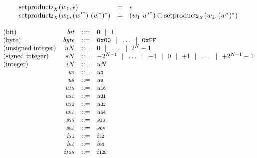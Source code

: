 $$
\begin{array}[t]{@{}lcl@{}l@{}}
{{\mathrm{setproduct{\kern-0.1em\scriptstyle 2}}}}_{X}(w_1, \epsilon) & = & \epsilon \\
{{\mathrm{setproduct{\kern-0.1em\scriptstyle 2}}}}_{X}(w_1, ({{w'}^\ast})~{({w^\ast})^\ast}) & = & (w_1~{{w'}^\ast}) \oplus {{\mathrm{setproduct{\kern-0.1em\scriptstyle 2}}}}_{X}(w_1, {({w^\ast})^\ast}) \\
\end{array}
$$

\vspace{1ex}

$$
\begin{array}[t]{@{}lrrl@{}l@{}}
\mbox{(bit)} & {\mathit{bit}} & ::= & 0 ~~|~~ 1 \\
\mbox{(byte)} & {\mathit{byte}} & ::= & \mathtt{0x00} ~~|~~ \ldots ~~|~~ \mathtt{0xFF} \\
\mbox{(unsigned integer)} & {u}{N} & ::= & 0 ~~|~~ \ldots ~~|~~ {2^{N}} - 1 \\
\mbox{(signed integer)} & {s}{N} & ::= & {-{2^{N - 1}}} ~~|~~ \ldots ~~|~~ {-1} ~~|~~ 0 ~~|~~ {+1} ~~|~~ \ldots ~~|~~ {+{2^{N - 1}}} - 1 \\
\mbox{(integer)} & {i}{N} & ::= & {u}{N} \\
& {\mathit{u{\kern-0.1em\scriptstyle 0}}} & ::= & {u}{\mathsf{{\scriptstyle 0}}} \\
& {\mathit{u{\kern-0.1em\scriptstyle 8}}} & ::= & {u}{\mathsf{{\scriptstyle 8}}} \\
& {\mathit{u{\kern-0.1em\scriptstyle 16}}} & ::= & {u}{\mathsf{{\scriptstyle 16}}} \\
& {\mathit{u{\kern-0.1em\scriptstyle 31}}} & ::= & {u}{\mathsf{{\scriptstyle 31}}} \\
& {\mathit{u{\kern-0.1em\scriptstyle 32}}} & ::= & {u}{\mathsf{{\scriptstyle 32}}} \\
& {\mathit{u{\kern-0.1em\scriptstyle 64}}} & ::= & {u}{\mathsf{{\scriptstyle 64}}} \\
& {\mathit{s{\kern-0.1em\scriptstyle 33}}} & ::= & {s}{\mathsf{{\scriptstyle 33}}} \\
& {\mathit{s{\kern-0.1em\scriptstyle 64}}} & ::= & {s}{\mathsf{{\scriptstyle 64}}} \\
& {\mathit{i{\kern-0.1em\scriptstyle 32}}} & ::= & {i}{\mathsf{{\scriptstyle 32}}} \\
& {\mathit{i{\kern-0.1em\scriptstyle 64}}} & ::= & {i}{\mathsf{{\scriptstyle 64}}} \\
& {\mathit{i{\kern-0.1em\scriptstyle 128}}} & ::= & {i}{\mathsf{{\scriptstyle 128}}} \\
\end{array}
$$

